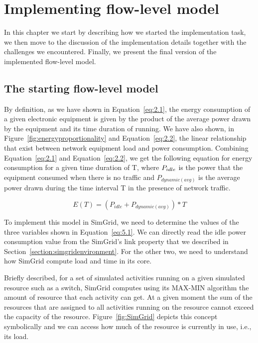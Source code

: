 \chapter{Implementing flow-level model}
\label{chapter:implementation}

In this chapter we start by describing how we started the implementation task, we then move to the discussion of the implementation details together with the challenges we encountered. Finally, we present the final version of the implemented flow-level model. 
\section{The starting flow-level model}
By definition, as we have shown in Equation~\ref{eq:2.1}, the energy consumption of a given electronic equipment is given by the product of the average power drawn by the equipment and its time duration of running. We have also shown, in Figure~\ref{fig:energyproportionality} and Equation~\ref{eq:2.2}, the linear relationship that exist between network equipment load and power consumption. Combining Equation~\ref{eq:2.1} and Equation~\ref{eq:2.2}, we get the following equation for energy consumption for a given time duration of T, where \($$P_{idle}$$\) is the power that the equipment consumed when there is no traffic and \(P_{dynamic (avg)}\) is the average power drawn during the time interval T in the presence of network traffic.

\begin{equation} \label{eq:5.1}
E(T) = (P_{idle} + P_{dynamic (avg)}) * T 
\end{equation} 

To implement this model in SimGrid, we need to determine the values of the three variables shown in Equation~\ref{eq:5.1}. We can directly read the idle power consumption value from the SimGrid's link property that we described in Section~\ref{section:simgridenvironment}. For the other two, we need to understand how SimGrid compute load and time in its core. 

Briefly described, for a set of simulated activities running on a given simulated resource such as a switch, SimGrid computes using its MAX-MIN algorithm the amount of resource that each activity can get. At a given moment the sum of the resources that are assigned to all activities running on the resource cannot exceed the capacity of the resource. Figure~\ref{fig:SimGrid} depicts this concept symbolically and we can access how much of the resource is currently in use, i.e., its load. 


